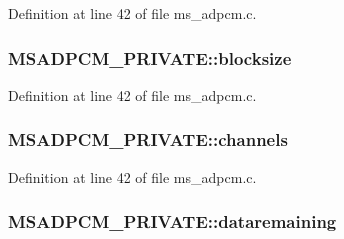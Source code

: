 Definition at line 42 of file ms\+\_\+adpcm.\+c.

\subsubsection[{\texorpdfstring{blocksize}{blocksize}}]{ M\+S\+A\+D\+P\+C\+M\+\_\+\+P\+R\+I\+V\+A\+T\+E\+::blocksize}\hypertarget{struct_m_s_a_d_p_c_m___p_r_i_v_a_t_e_ab2f9a028faec2797e07fee0c41716820}{}\label{struct_m_s_a_d_p_c_m___p_r_i_v_a_t_e_ab2f9a028faec2797e07fee0c41716820}


Definition at line 42 of file ms\+\_\+adpcm.\+c.

\subsubsection[{\texorpdfstring{channels}{channels}}]{ M\+S\+A\+D\+P\+C\+M\+\_\+\+P\+R\+I\+V\+A\+T\+E\+::channels}\hypertarget{struct_m_s_a_d_p_c_m___p_r_i_v_a_t_e_aa3e1a6d1616e9a1905218debb872bbf6}{}\label{struct_m_s_a_d_p_c_m___p_r_i_v_a_t_e_aa3e1a6d1616e9a1905218debb872bbf6}


Definition at line 42 of file ms\+\_\+adpcm.\+c.

\subsubsection[{\texorpdfstring{dataremaining}{dataremaining}}]{ M\+S\+A\+D\+P\+C\+M\+\_\+\+P\+R\+I\+V\+A\+T\+E\+::dataremaining}\hypertarget{struct_m_s_a_d_p_c_m___p_r_i_v_a_t_e_aba95b775a61bbaf14a82dd1528829b9c}{}\label{struct_m_s_a_d_p_c_m___p_r_i_v_a_t_e_aba95b775a61bbaf14a82dd1528829b9c}


